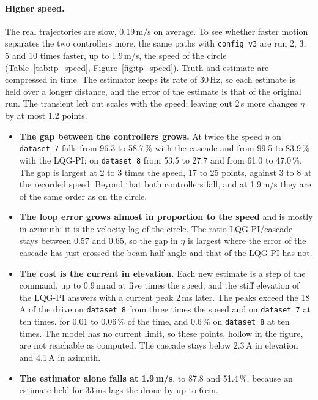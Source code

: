 \paragraph{Higher speed.} The real trajectories are slow, 0.19\,m/s on average. To see whether faster motion separates the two controllers more, the same paths with \texttt{config\_v3} are run 2, 3, 5 and 10 times faster, up to 1.9\,m/s, the speed of the circle (Table~\ref{tab:tp_speed}, Figure~\ref{fig:tp_speed}). Truth and estimate are compressed in time. The estimator keeps its rate of 30\,Hz, so each estimate is held over a longer distance, and the error of the estimate is that of the original run. The transient left out scales with the speed; leaving out 2\,s more changes $\eta$ by at most 1.2 points.
\begin{itemize}
\item \textbf{The gap between the controllers grows.} At twice the speed $\eta$ on \texttt{dataset\_7} falls from 96.3 to 58.7\,\% with the cascade and from 99.5 to 83.9\,\% with the LQG-PI; on \texttt{dataset\_8} from 53.5 to 27.7 and from 61.0 to 47.0\,\%. The gap is largest at 2 to 3 times the speed, 17 to 25 points, against 3 to 8 at the recorded speed. Beyond that both controllers fall, and at 1.9\,m/s they are of the same order as on the circle.
\item \textbf{The loop error grows almost in proportion to the speed} and is mostly in azimuth: it is the velocity lag of the circle. The ratio LQG-PI/cascade stays between 0.57 and 0.65, so the gap in $\eta$ is largest where the error of the cascade has just crossed the beam half-angle and that of the LQG-PI has not.
\item \textbf{The cost is the current in elevation.} Each new estimate is a step of the command, up to 0.9\,mrad at five times the speed, and the stiff elevation of the LQG-PI answers with a current peak 2\,ms later. The peaks exceed the 18\,A of the drive on \texttt{dataset\_8} from three times the speed and on \texttt{dataset\_7} at ten times, for 0.01 to 0.06\,\% of the time, and 0.6\,\% on \texttt{dataset\_8} at ten times. The model has no current limit, so these points, hollow in the figure, are not reachable as computed. The cascade stays below 2.3\,A in elevation and 4.1\,A in azimuth.
\item \textbf{The estimator alone falls at 1.9\,m/s}, to 87.8 and 51.4\,\%, because an estimate held for 33\,ms lags the drone by up to 6\,cm.
\end{itemize}

